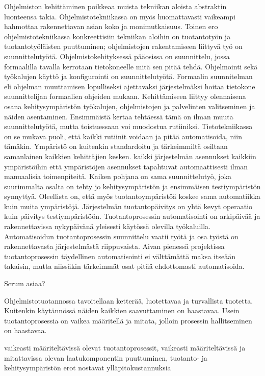 \documentclass[finnish,12pt,a4paper,pdftex]{article}
\begin{document}
Ohjelmiston kehittäminen poikkeaa muista tekniikan aloista abstraktin luonteensa takia. Ohjelmistotekniikassa on myös huomattavasti vaikeampi hahmottaa rakennettavan asian koko ja monimutkaisuus. Toinen ero ohjelmistotekniikassa konkreettisiin tekniikan aloihin on tuotantotyön ja tuotantotyöläisten puuttuminen; ohjelmistojen rakentamiseen liittyvä työ on suunnittelutyötä. Ohjelmistokehityksessä pääosissa on suunnittelu, jossa formaalilla tavalla kerrotaan tietokoneelle mitä sen pitää tehdä. Ohjelmointi sekä työkalujen käyttö ja konfigurointi on suunnittelutyötä. Formaalin suunnitelman eli ohjelman muuttamisen lopulliseksi ajettavaksi järjestelmäksi hoitaa tietokone suunnittelijan formaalien ohjeiden mukaan. Kehittämiseen liittyy olennaisena osana kehitysympäristön työkalujen, ohjelmistojen ja palvelinten valitseminen ja näiden asentaminen. Ensimmäistä kertaa tehtäessä tämä on ilman muuta suunnittelutyötä, mutta toistuessaan voi muodostua rutiiniksi. Tietotekniikassa on se mukava puoli, että kaikki rutiinit voidaan ja pitää automatisoida, niin tämäkin. Ympäristö on kuitenkin standardoitu ja tärkeimmiltä osiltaan samanlainen kaikkien kehittäjien kesken. kaikki järjestelmän asennukset kaikkiin ympäristöihin että ympäristöjen asennukset tapahtuvat automaattisesti ilman manuaalisia toimenpiteitä. Kaiken pohjana on sama suunnittelutyö, joka suurimmalta osalta on tehty jo kehitysympäristön ja ensimmäisen testiympäristön synnyttyä. Oleellista on, että myös tuotantoympäristöä koskee sama automatiikka kuin muita ympäristöjä. Järjestelmän tuotantopäivitys on yhtä kevyt operaatio kuin päivitys testiympäristöön. Tuotantoprosessin automatisointi on arkipäivää ja rakennettavissa nykypäivänä yleisesti käytössä olevilla työkaluilla. Automatisoidun tuotantoprosessin suunnittelu vaatii työtä ja osa työstä on rakennettavasta järjestelmästä riippuvaista. Aivan pienessä projektissa tuotantoprosessin täydellinen automatisointi ei välttämättä maksa itseään takaisin, mutta niissäkin tärkeimmät osat pitää ehdottomasti automatisoida. \citep{kallio}

Scrum asiaa?

Ohjelmistotuotannossa tavoitellaan ketterää, luotettavaa ja turvallista tuotetta. Kuitenkin käytännössä näiden kaikkien saavuttaminen on haastavaa. Usein tuotantoprosessia on vaikea määritellä ja mitata, jolloin prosessin hallitseminen on haastavaa. 

vaikeasti määriteltävissä olevat tuotantoprosessit, vaikeasti määriteltävissä ja mitattavissa olevan laatukomponentin puuttuminen, tuotanto- ja kehitysympäristön erot nostavat ylläpitokustannuksia 
\end{document}
